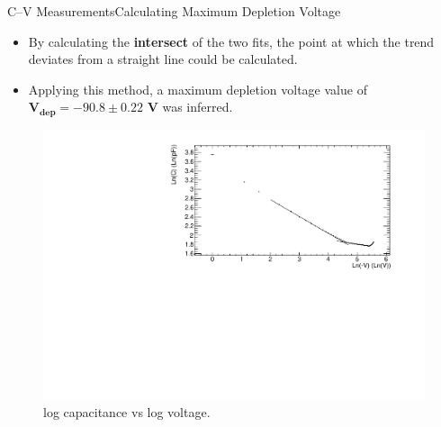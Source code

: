 \documentclass{beamer}
\begin{document}
    \begin{frame}{C--V Measurements}{Calculating Maximum Depletion Voltage}
        \begin{itemize}
            \item By calculating the \textbf{intersect} of the two fits, the point at which the trend deviates from a straight line could be calculated.
            \vspace{0.3cm}
            \item Applying this method, a maximum depletion voltage value of $\bm{V_{dep} = -90.8 \pm 0.22}$ \textbf{V} was inferred. 
        \end{itemize}
        \begin{figure}
            \centering
            \includegraphics[width = 0.7\linewidth]{Diode2_nonirradiated_CV_noextrapolation_1711.pdf}
            \vspace{-0.4cm}
            \caption{log capacitance vs log voltage.}
            \label{fig:CVNonIrradiated}
        \end{figure}
    \end{frame}
    
\end{document}
